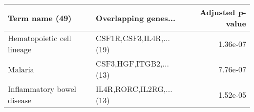 \begin{tabular}{llr}
\toprule
            Term name (49) &    Overlapping genes... &  Adjusted p-value \\
\midrule
Hematopoietic cell lineage & CSF1R,CSF3,IL4R,...(19) &          1.36e-07 \\
                   Malaria &  CSF3,HGF,ITGB2,...(13) &          7.76e-07 \\
Inflammatory bowel disease & IL4R,RORC,IL2RG,...(13) &          1.52e-05 \\
\bottomrule
\end{tabular}
